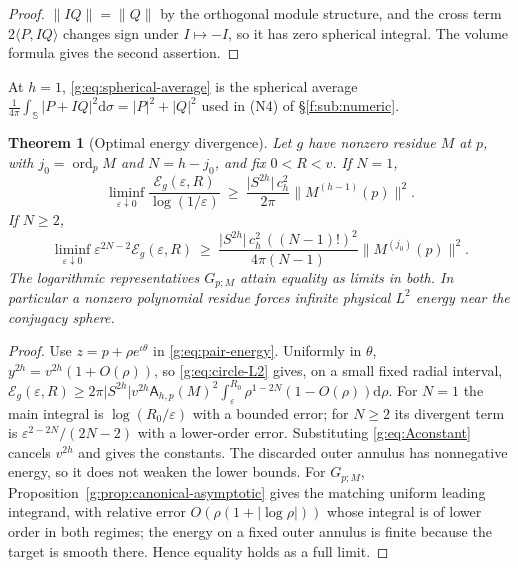 \documentclass[11pt,a4paper]{article}
\numberwithin{equation}{section}
\newtheorem{theorem}{Theorem}[section]
\theoremstyle{definition}
\theoremstyle{remark}
\theoremstyle{plain}
\newcommand{\SSS}{\mathbb S}
\newcommand{\Eg}{\mathcal E_{g}}
\newcommand{\abs}[1]{\lvert #1\rvert}
\newcommand{\norm}[1]{\lVert #1\rVert}
\newcommand{\dd}{\mathrm d}
\DeclareMathOperator{\ord}{ord}
\begin{document}
\begin{proof}
$\norm{IQ}=\norm Q$ by the orthogonal module structure, and the cross term
$2\langle P,IQ\rangle$ changes sign under $I\mapsto-I$, so it has zero
spherical integral. The volume formula gives the second assertion.
\end{proof}

At $h=1$, \eqref{g:eq:spherical-average} is the spherical average
$\frac1{4\pi}\int_{\SSS}\abs{P+IQ}^2\dd\sigma=\abs P^2+\abs Q^2$ used in (N4) of
\S\ref{f:sub:numeric}.

\begin{theorem}[Optimal energy divergence]
\label{g:thm:energy}
Let $g$ have nonzero residue $M$ at $p$, with $j_0=\ord_pM$ and $N=h-j_0$, and
fix $0<R<v$. If $N=1$,
\begin{equation}\label{g:eq:energy-log}
 \liminf_{\varepsilon\downarrow0}\frac{\Eg(\varepsilon,R)}{\log(1/\varepsilon)}
 \ \ge\ \frac{\abs{S^{2h}}\,c_h^2}{2\pi}\norm{M^{(h-1)}(p)}^2 .
\end{equation}
If $N\ge2$,
\begin{equation}\label{g:eq:energy-power}
 \liminf_{\varepsilon\downarrow0}\varepsilon^{2N-2}\Eg(\varepsilon,R)
 \ \ge\ \frac{\abs{S^{2h}}\,c_h^2\,((N-1)!)^2}{4\pi(N-1)}\norm{M^{(j_0)}(p)}^2 .
\end{equation}
The logarithmic representatives $G_{p;M}$ attain equality as limits in both.
In particular a nonzero polynomial residue forces infinite physical $L^2$
energy near the conjugacy sphere.
\end{theorem}

\begin{proof}
Use $z=p+\rho e^{\iota\theta}$ in \eqref{g:eq:pair-energy}. Uniformly in $\theta$,
$y^{2h}=v^{2h}(1+O(\rho))$, so \eqref{g:eq:circle-L2} gives, on a small fixed
radial interval,
$\Eg(\varepsilon,R)\ge2\pi\abs{S^{2h}}v^{2h}\mathsf A_{h,p}(M)^2
\int_\varepsilon^{R_0}\rho^{1-2N}(1-O(\rho))\dd\rho$. For $N=1$ the main
integral is $\log(R_0/\varepsilon)$ with a bounded error; for $N\ge2$ its
divergent term is $\varepsilon^{2-2N}/(2N-2)$ with a lower-order error.
Substituting \eqref{g:eq:Aconstant} cancels $v^{2h}$ and gives the constants.
The discarded outer annulus has nonnegative energy, so it does not weaken the
lower bounds. For $G_{p;M}$, Proposition~\ref{g:prop:canonical-asymptotic} gives
the matching uniform leading integrand, with relative error
$O(\rho(1+\abs{\log\rho}))$ whose integral is of lower order in both regimes;
the energy on a fixed outer annulus is finite because the target is smooth
there. Hence equality holds as a full limit.
\end{proof}
\end{document}
